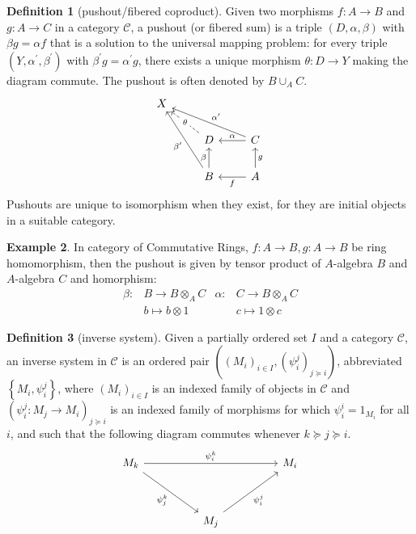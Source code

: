 \documentclass[a4paper,12pt]{article}
\theoremstyle{definition}
\newtheorem{defn}{Definition}[subsection]
\newtheorem{exam}[defn]{Example}
\begin{document}
\begin{defn}[pushout/fibered coproduct]
    Given two morphisms $f: A \rightarrow B$ and $g: A \rightarrow C$ in a category $\mathcal{C}$, a pushout (or fibered sum) is a triple $(D, \alpha, \beta)$ with $\beta g=\alpha f$ that is a solution to the universal mapping problem: for every triple $\left(Y, \alpha^{\prime}, \beta^{\prime}\right)$ with $\beta^{\prime} g=\alpha^{\prime} g$, there exists a unique morphism $\theta: D \rightarrow Y$ making the diagram commute. The pushout is often denoted by $B \cup_A C$.
    \begin{equation*}
        \begin{tikzcd}
            X \\
            & D & C \\
            & B & A
            \arrow["\alpha"', from=2-3, to=2-2]
            \arrow["g"', from=3-3, to=2-3]
            \arrow["f", from=3-3, to=3-2]
            \arrow["\beta", from=3-2, to=2-2]
            \arrow["{\alpha^{\prime}}"', from=2-3, to=1-1]
            \arrow["{\beta^{\prime}}", from=3-2, to=1-1]
            \arrow["\theta"{description}, dashed, from=2-2, to=1-1]
        \end{tikzcd}\
    \end{equation*}
    Pushouts are unique to isomorphism when they exist, for they are initial objects in a suitable category.
\end{defn}
\begin{exam}
    In category of Commutative Rings, $f:A\rightarrow B, g:A\rightarrow B$ be ring homomorphism, then the pushout is given by tensor product of $A$-algebra $B$ and $A$-algebra $C$ and homorphism:
    \begin{align*}
        \beta: & B\rightarrow B\otimes_A C & \alpha: & C\rightarrow B\otimes_A C \\
               & b\mapsto b\otimes 1       &         & c\mapsto 1\otimes c
    \end{align*}
\end{exam}
\begin{defn}[inverse system]
    Given a partially ordered set $I$ and a category $\mathcal{C}$, an inverse system in $\mathcal{C}$ is an ordered pair $\left(\left(M_i\right)_{i \in I},\left(\psi_i^j\right)_{j \succeq i}\right)$, abbreviated $\left\{M_i, \psi_i^j\right\}$, where $\left(M_i\right)_{i \in I}$ is an indexed family of objects in $\mathcal{C}$ and $\left(\psi_i^j: M_j \rightarrow M_i\right)_{j \succeq i}$ is an indexed family of morphisms for which $\psi_i^i=1_{M_i}$ for all $i$, and such that the following diagram commutes whenever $k \succeq j \succeq i$.
    \[\begin{tikzcd}
            {M_k} &&&& {M_i} \\
            \\
            && {M_j}
            \arrow["{\psi^{k}_{i}}", from=1-1, to=1-5]
            \arrow["{\psi^{k}_{j}}"', from=1-1, to=3-3]
            \arrow["{\psi^{j}_{i}}"', from=3-3, to=1-5]
        \end{tikzcd}\]
\end{defn}
\end{document}
